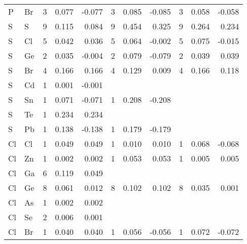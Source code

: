 \begin{table}
\begin{center}
\begin{tabular}{llrrrrrrrrr}
  P &  Br &   3 &    0.077 &   -0.077 &   3 &    0.085 &   -0.085 &   3 &    0.058 &   -0.058 \\
  S &   S &   9 &    0.115 &    0.084 &   9 &    0.454 &    0.325 &   9 &    0.264 &    0.234 \\
  S &  Cl &   5 &    0.042 &    0.036 &   5 &    0.064 &   -0.002 &   5 &    0.075 &   -0.015 \\
  S &  Ge &   2 &    0.035 &   -0.004 &   2 &    0.079 &   -0.079 &   2 &    0.039 &    0.039 \\
  S &  Br &   4 &    0.166 &    0.166 &   4 &    0.129 &    0.009 &   4 &    0.166 &    0.118 \\
  S &  Cd &   1 &    0.001 &   -0.001 &     &          &          &     &          &          \\
  S &  Sn &   1 &    0.071 &   -0.071 &   1 &    0.208 &   -0.208 &     &          &          \\
  S &  Te &   1 &    0.234 &    0.234 &     &          &          &     &          &          \\
  S &  Pb &   1 &    0.138 &   -0.138 &   1 &    0.179 &   -0.179 &     &          &          \\
 Cl &  Cl &   1 &    0.049 &    0.049 &   1 &    0.010 &    0.010 &   1 &    0.068 &   -0.068 \\
 Cl &  Zn &   1 &    0.002 &    0.002 &   1 &    0.053 &    0.053 &   1 &    0.005 &    0.005 \\
 Cl &  Ga &   6 &    0.119 &    0.049 &     &          &          &     &          &          \\
 Cl &  Ge &   8 &    0.061 &    0.012 &   8 &    0.102 &    0.102 &   8 &    0.035 &    0.001 \\
 Cl &  As &   1 &    0.002 &    0.002 &     &          &          &     &          &          \\
 Cl &  Se &   2 &    0.006 &    0.001 &     &          &          &     &          &          \\
 Cl &  Br &   1 &    0.040 &    0.040 &   1 &    0.056 &   -0.056 &   1 &    0.072 &   -0.072 \\
\hline
\end{tabular}
\end{center}
\end{table}

